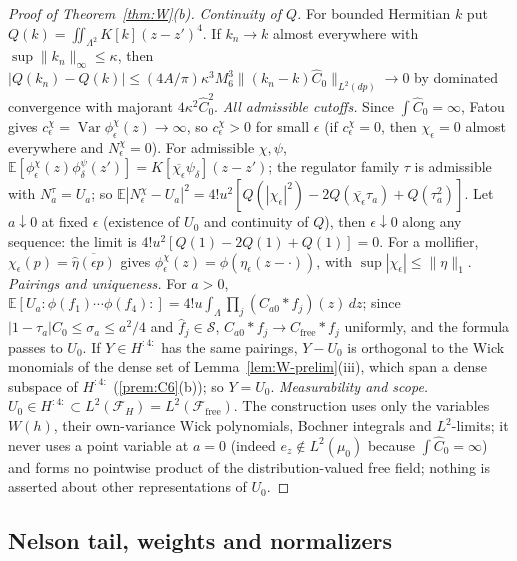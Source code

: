 \documentclass[11pt]{article}
\theoremstyle{plain}
\theoremstyle{definition}
\theoremstyle{remark}
\newcommand{\E}{\mathbb{E}}
\newcommand{\cF}{\mathcal{F}}
\newcommand{\cS}{\mathcal{S}}
\newcommand{\Cfree}{C_{\mathrm{free}}}
\newcommand{\conj}[1]{\overline{#1}}
\DeclareMathOperator{\Var}{Var}
\begin{document}
\begin{proof}[Proof of Theorem~\ref{thm:W}(b)]
\emph{Continuity of $Q$.} For bounded Hermitian $k$ put $Q(k)=\iint_{\Lambda^{2}}K[k](z-z')^{4}$. If
$k_n\to k$ almost everywhere with $\sup\|k_n\|_\infty\le\kappa$, then
$|Q(k_n)-Q(k)|\le(4A/\pi)\kappa^{3}M_6^{3}\|(k_n-k)\hat C_0\|_{L^{2}(dp)}\to0$ by dominated convergence with
majorant $4\kappa^{2}\hat C_0^{2}$. \emph{All admissible cutoffs.} Since $\int\hat C_0=\infty$, Fatou gives
$c^{\chi}_\epsilon=\Var\phi^{\chi}_\epsilon(z)\to\infty$, so $c^{\chi}_\epsilon>0$ for small $\epsilon$ (if $c^{\chi}_\epsilon=0$, then $\chi_\epsilon=0$ almost
everywhere and $N^{\chi}_\epsilon=0$). For admissible $\chi,\psi$,
$\E[\phi^{\chi}_\epsilon(z)\phi^{\psi}_\delta(z')]=K[\conj{\chi_\epsilon}\psi_\delta](z-z')$; the regulator family $\tau$ is admissible with
$N^{\tau}_a=U_a$; so $\E|N^{\chi}_\epsilon-U_a|^{2}=4!u^{2}[Q(|\chi_\epsilon|^{2})-2Q(\conj{\chi_\epsilon}\tau_a)+Q(\tau_a^{2})]$. Let $a\downarrow0$ at
fixed $\epsilon$ (existence of $U_0$ and continuity of $Q$), then $\epsilon\downarrow0$ along any sequence:
the limit is $4!u^{2}[Q(1)-2Q(1)+Q(1)]=0$. For a mollifier,
$\chi_\epsilon(p)=\conj{\hat\eta(\epsilon p)}$ gives $\phi^{\chi}_\epsilon(z)=\phi(\eta_\epsilon(z-\cdot))$, with $\sup|\chi_\epsilon|\le\|\eta\|_1$.
\emph{Pairings and uniqueness.} For $a>0$,
$\E[U_a{:}\phi(f_1)\cdots\phi(f_4){:}]=4!u\int_\Lambda\prod_j(C_{a0}*f_j)(z)\,dz$; since
$|1-\tau_a|\hat C_0\le\sigma_a\le a^{2}/4$ and $\hat f_j\in\cS$, $C_{a0}*f_j\to\Cfree*f_j$ uniformly, and the formula
passes to $U_0$. If $Y\in H^{{:}4{:}}$ has the same pairings, $Y-U_0$ is orthogonal to the Wick
monomials of the dense set of Lemma~\ref{lem:W-prelim}(iii), which span a dense
subspace of $H^{{:}4{:}}$ (\ref{prem:C6}(b)); so $Y=U_0$. \emph{Measurability and scope.}
$U_0\in H^{{:}4{:}}\subset L^{2}(\cF_H)=L^{2}(\cF_{\mathrm{free}})$. The construction uses only the variables
$W(h)$, their own-variance Wick polynomials, Bochner integrals and $L^{2}$-limits; it
never uses a point variable at $a=0$ (indeed $e_z\notin L^{2}(\mu_0)$ because $\int\hat C_0=\infty$) and
forms no pointwise product of the distribution-valued free field; nothing is
asserted about other representations of $U_0$.
\end{proof}

\subsection{Nelson tail, weights and normalizers}
\end{document}
